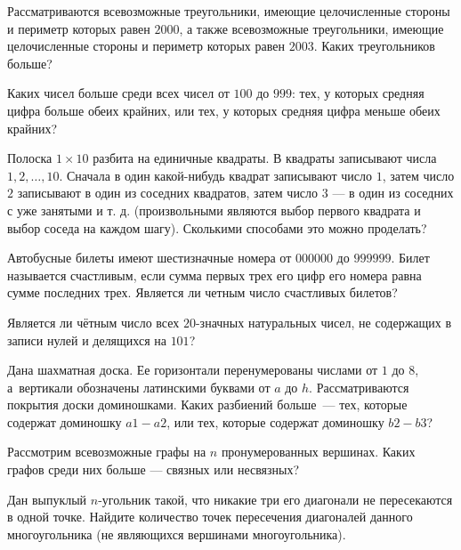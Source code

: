 \resetproblem \begingroup %
    \def\jeolmdate{07 ноября 2018г.}%
    \def\jeolmauthors{}%
\jeolmheader \endgroup


\begin{problems}

\item Рассматриваются всевозможные треугольники, имеющие целочисленные стороны и периметр которых равен $2000$, а также всевозможные треугольники, имеющие целочисленные стороны и периметр которых равен $2003$. Каких треугольников больше? 

\item Каких чисел больше среди всех чисел от $100$ до $999$: тех, у которых средняя цифра больше обеих крайних, или тех, у которых средняя цифра меньше обеих крайних?

\item Полоска $1\times 10$ разбита на единичные квадраты. В квадраты записывают числа $1, 2, \dots, 10$. Сначала в один какой-нибудь квадрат записывают число $1$, затем число $2$ записывают в один из соседних квадратов, затем число $3$ --- в один из соседних с уже занятыми и т. д. (произвольными являются выбор первого квадрата и выбор соседа на каждом шагу). Сколькими способами это можно проделать?

\item \subproblem Автобусные билеты имеют шестизначные номера от $000000$ до $999999$. Билет называется счастливым, если сумма первых трех его цифр его номера равна сумме последних трех. Является ли четным число счастливых билетов?

\subproblem Является ли чётным число всех $20$-значных натуральных чисел, не содержащих в записи нулей и делящихся на $101$?

\item Дана шахматная доска. Ее горизонтали перенумерованы числами от $1$ до $8$, а~вертикали обозначены латинскими буквами от $a$ до $h$. Рассматриваются покрытия доски доминошками. Каких разбиений больше~--- тех, которые содержат доминошку $a1-a2$, или тех, которые содержат доминошку $b2-b3$?

\item Рассмотрим всевозможные графы на $n$ пронумерованных вершинах. Каких графов среди них больше --- связных или несвязных?

\item Дан выпуклый $n$-угольник такой, что никакие три его диагонали не пересекаются в одной точке. Найдите количество точек пересечения диагоналей данного многоугольника (не являющихся вершинами многоугольника).



\end{problems}
